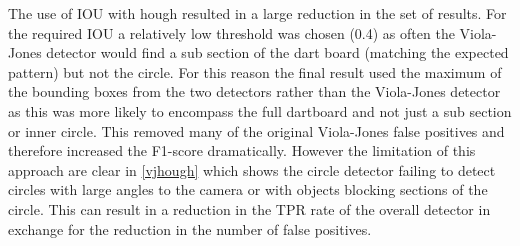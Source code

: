 \documentclass{article}
\begin{document}
\begin{multicols}{2}
The use of IOU with hough resulted in a large reduction in the set of results.
For the required IOU a relatively low threshold was chosen (0.4) as often the
Viola-Jones detector would find a sub section of the dart board (matching the
expected pattern) but not the circle.  For this reason the final result used
the maximum of the bounding boxes from the two detectors rather than the
Viola-Jones detector as this was more likely to encompass the full dartboard
and not just a sub section or inner circle. This removed many of the original
Viola-Jones false positives and therefore increased the F1-score dramatically.
However the limitation of this approach are clear in \ref{vjhough} which shows
the circle detector failing to detect circles with large angles to the camera
or with objects blocking sections of the circle.  This can result in a
reduction in the TPR rate of the overall detector in exchange for the reduction
in the number of false positives.


\end{multicols}
\end{document}
